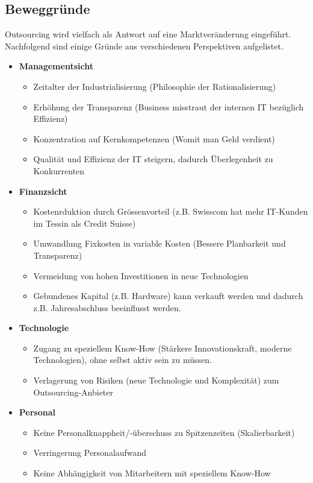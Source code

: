 \subsection{Beweggründe}
Outsourcing wird vielfach als Antwort auf eine Marktveränderung eingeführt. Nachfolgend sind einige Gründe aus verschiedenen Perspektiven aufgelistet.
\begin{itemize}
	\item \textbf{Managementsicht}
	\begin{itemize}
		\item Zeitalter der Industrialisierung (Philosophie der Rationalisierung)
		\item Erhöhung der Transparenz (Business misstraut der internen IT bezüglich Effizienz)
		\item Konzentration auf Kernkompetenzen (Womit man Geld verdient)
		\item Qualität und Effizienz der IT steigern, dadurch Überlegenheit zu Konkurrenten
	\end{itemize}
	\item \textbf{Finanzsicht}
	\begin{itemize}
		\item Kostenrduktion durch Grössenvorteil (z.B. Swisscom hat mehr IT-Kunden im Tessin als Credit Suisse)
		\item Umwandlung Fixkosten in variable Kosten (Bessere Planbarkeit und Transparenz)
		\item Vermeidung von hohen Investitionen in neue Technologien
		\item Gebundenes Kapital (z.B. Hardware) kann verkauft werden und dadurch z.B. Jahresabschluss beeinflusst werden.
	\end{itemize}
	\item \textbf{Technologie}
	\begin{itemize}
		\item Zugang zu speziellem Know-How (Stärkere Innovationskraft, moderne Technologien), ohne selbst aktiv sein zu müssen.
		\item Verlagerung von Risiken (neue Technologie und Komplexität) zum Outsourcing-Anbieter
	\end{itemize}
	\item \textbf{Personal}
	\begin{itemize}
		\item Keine Personalknappheit/-überschuss zu Spitzenzeiten (Skalierbarkeit)
		\item Verringerung Personalaufwand
		\item Keine Abhängigkeit von Mitarbeitern mit speziellem Know-How
	\end{itemize}
\end{itemize}


